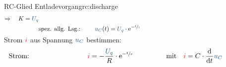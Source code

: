 {\begin{bsp}{RC-Glied Entladevorgang}{rc:discharge}
\begin{align*}
                    \Rightarrow\quad K = \ecv{U_q}\\
            &\text{spez. allg. Lsg.:}&&&
                \ecv{u_C}(t) &= \ecv{U_q} \cdot  \mathrm{e}^{-\sfrac{t}{\tau}}
            \\[-15pt]&\hphantom{R1oooooooooooo}&&&\hphantom{L3ooo}&\hphantom{R3oooooooooooooooo}&&&&\hphantom{R5oooooooooooooooooooooo}\nonumber%
            \end{align*}
        Strom ${\color{red}i}$ aus Spannung $\ecv{u_C}$ bestimmen:%
        \begin{align*}%
            &\text{Strom:}&&&
                \eci{i} &= - \frac{\ecv{U_q}}{R} \cdot \mathrm{e}^{-\sfrac{t}{\tau}} &&&
                &\text{mit}\quad \eci{i} = C \cdot \dt \ecv{u_C}
            \\[-15pt]&\hphantom{R1oooooooooooo}&&&\hphantom{L3ooo}&\hphantom{R3oooooooooooooooo}&&&&\hphantom{R5oooooooooooooooooooooo}\nonumber%
        \end{align*}
        \endgroup
    \end{bsp}
}%



